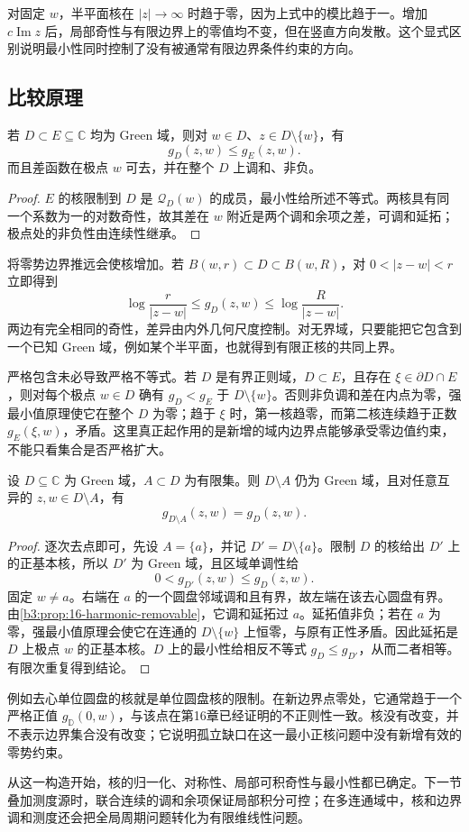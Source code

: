 \ProseParagraphBreak
对固定 \(w\)，半平面核在 \(|z|\to\infty\) 时趋于零，因为上式中的模比趋于一。增加 \(c\operatorname{Im}z\) 后，局部奇性与有限边界上的零值均不变，但在竖直方向发散。这个显式区别说明最小性同时控制了没有被通常有限边界条件约束的方向。

\subsection{比较原理}
\label{b3:subsec:170304}

\begin{proposition}\label{b3:prop:17-domain-monotonicity}
若 \(D\subset E\subseteq\mathbb C\) 均为 Green 域，则对 \(w\in D\)、\(z\in D\setminus\{w\}\)，有
\[
 g_D(z,w)\le g_E(z,w).
\]
而且差函数在极点 \(w\) 可去，并在整个 \(D\) 上调和、非负。
\end{proposition}
\begin{proof}
\(E\) 的核限制到 \(D\) 是 \(\mathcal Q_D(w)\) 的成员，最小性给所述不等式。两核具有同一个系数为一的对数奇性，故其差在 \(w\) 附近是两个调和余项之差，可调和延拓；极点处的非负性由连续性继承。
\end{proof}

将零势边界推远会使核增加。若 \(B(w,r)\subset D\subset B(w,R)\)，对 \(0<|z-w|<r\) 立即得到
\[
 \log\frac r{|z-w|}\le g_D(z,w)\le\log\frac R{|z-w|}.
\]
两边有完全相同的奇性，差异由内外几何尺度控制。对无界域，只要能把它包含到一个已知 Green 域，例如某个半平面，也就得到有限正核的共同上界。

\ProseParagraphBreak
严格包含未必导致严格不等式。若 \(D\) 是有界正则域，\(D\subset E\)，且存在 \(\xi\in\partial D\cap E\)，则对每个极点 \(w\in D\) 确有 \(g_D<g_E\) 于 \(D\setminus\{w\}\)。否则非负调和差在内点为零，强最小值原理使它在整个 \(D\) 为零；趋于 \(\xi\) 时，第一核趋零，而第二核连续趋于正数 \(g_E(\xi,w)\)，矛盾。这里真正起作用的是新增的域内边界点能够承受零边值约束，不能只看集合是否严格扩大。

\begin{proposition}\label{b3:prop:17-removing-points}
设 \(D\subseteq\mathbb C\) 为 Green 域，\(A\subset D\) 为有限集。则 \(D\setminus A\) 仍为 Green 域，且对任意互异的 \(z,w\in D\setminus A\)，有
\[
 g_{D\setminus A}(z,w)=g_D(z,w).
\]
\end{proposition}
\begin{proof}
逐次去点即可，先设 \(A=\{a\}\)，并记 \(D'=D\setminus\{a\}\)。限制 \(D\) 的核给出 \(D'\) 上的正基本核，所以 \(D'\) 为 Green 域，且区域单调性给
\[
 0<g_{D'}(z,w)\le g_D(z,w).
\]
固定 \(w\ne a\)。右端在 \(a\) 的一个圆盘邻域调和且有界，故左端在该去心圆盘有界。由\cref{b3:prop:16-harmonic-removable}，它调和延拓过 \(a\)。延拓值非负；若在 \(a\) 为零，强最小值原理会使它在连通的 \(D\setminus\{w\}\) 上恒零，与原有正性矛盾。因此延拓是 \(D\) 上极点 \(w\) 的正基本核。\(D\) 上的最小性给相反不等式 \(g_D\le g_{D'}\)，从而二者相等。有限次重复得到结论。
\end{proof}

例如去心单位圆盘的核就是单位圆盘核的限制。在新边界点零处，它通常趋于一个严格正值 \(g_{\mathbb D}(0,w)\)，与该点在第16章已经证明的不正则性一致。核没有改变，并不表示边界集合没有改变；它说明孤立缺口在这一最小正核问题中没有新增有效的零势约束。

\ProseParagraphBreak
从这一构造开始，核的归一化、对称性、局部可积奇性与最小性都已确定。下一节叠加测度源时，联合连续的调和余项保证局部积分可控；在多连通域中，核和边界调和测度还会把全局周期问题转化为有限维线性问题。

